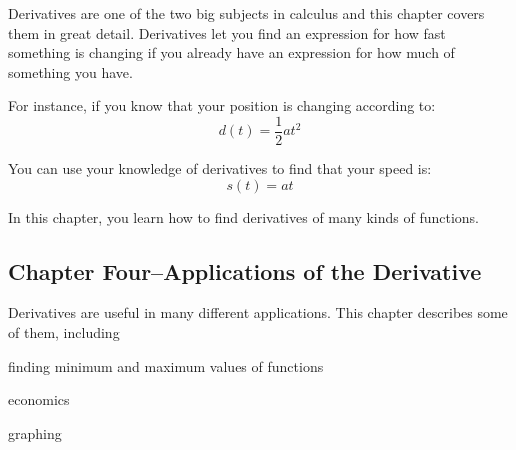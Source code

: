 \documentclass[fleqn, onecolumn]{article}
\begin{document}
Derivatives are one of the two big subjects in calculus and this chapter covers them in great detail.  Derivatives let
you find an expression for how fast something is changing if you already have an expression for how much of something
you have.  

For instance, if you know that your position is changing according to:
\[
  d(t) = \frac{1}{2} at^2
\]

You can use your knowledge of derivatives to find that your speed is:
\[
  s(t) = at
\]


In this chapter, you learn how to find derivatives of many kinds of functions.

\subsection{Chapter Four--Applications of the Derivative}

Derivatives are useful in many different applications.  This chapter describes some of them, including
\begin{itemize*}
  \item finding minimum and maximum values of functions
  \item economics
  \item graphing
\end{itemize*}
\end{document}
